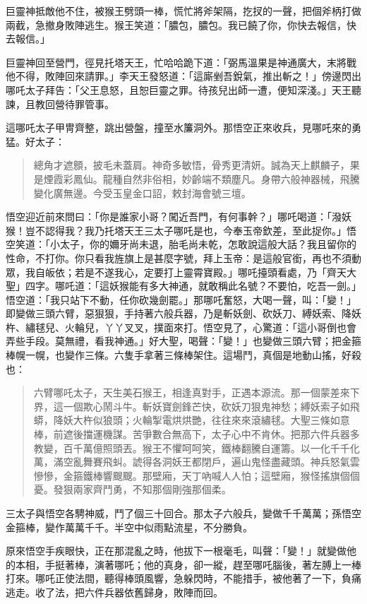 巨靈神抵敵他不住，被猴王劈頭一棒，慌忙將斧架隔，扢扠的一聲，把個斧柄打做兩截，急撤身敗陣逃生。猴王笑道：「膿包，膿包。我已饒了你，你快去報信，快去報信。」

巨靈神回至營門，徑見托塔天王，忙哈哈跪下道：「弼馬溫果是神通廣大，末將戰他不得，敗陣回來請罪。」李天王發怒道：「這廝剉吾銳氣，推出斬之！」傍邊閃出哪吒太子拜告：「父王息怒，且恕巨靈之罪。待孩兒出師一遭，便知深淺。」天王聽諫，且教回營待罪管事。

這哪吒太子甲冑齊整，跳出營盤，撞至水簾洞外。那悟空正來收兵，見哪吒來的勇猛。好太子：
\begin{quote}
總角才遮顖，披毛未蓋肩。神奇多敏悟，骨秀更清妍。誠為天上麒麟子，果是煙霞彩鳳仙。龍種自然非俗相，妙齡端不類塵凡。身帶六般神器械，飛騰變化廣無邊。今受玉皇金口詔，敕封海會號三壇。
\end{quote}

悟空迎近前來問曰：「你是誰家小哥？闖近吾門，有何事幹？」哪吒喝道：「潑妖猴！豈不認得我？我乃托塔天王三太子哪吒是也，今奉玉帝欽差，至此捉你。」悟空笑道：「小太子，你的嬭牙尚未退，胎毛尚未乾，怎敢說這般大話？我且留你的性命，不打你。你只看我旌旗上是甚麼字號，拜上玉帝：是這般官銜，再也不須動眾，我自皈依；若是不遂我心，定要打上靈霄寶殿。」哪吒擡頭看處，乃「齊天大聖」四字。哪吒道：「這妖猴能有多大神通，就敢稱此名號？不要怕，吃吾一劍。」悟空道：「我只站下不動，任你砍幾劍罷。」那哪吒奮怒，大喝一聲，叫：「變！」即變做三頭六臂，惡狠狠，手持著六般兵器，乃是斬妖劍、砍妖刀、縛妖索、降妖杵、繡毬兒、火輪兒，丫丫叉叉，撲面來打。悟空見了，心驚道：「這小哥倒也會弄些手段。莫無禮，看我神通。」好大聖，喝聲：「變！」也變做三頭六臂；把金箍棒幌一幌，也變作三條。六隻手拿著三條棒架住。這場鬥，真個是地動山搖，好殺也：
\begin{quote}
六臂哪吒太子，天生美石猴王，相逢真對手，正遇本源流。那一個蒙差來下界，這一個欺心鬧斗牛。斬妖寶劍鋒芒快，砍妖刀狠鬼神愁；縛妖索子如飛蟒，降妖大杵似狼頭；火輪掣電烘烘艷，往往來來滾繡毬。大聖三條如意棒，前遮後擋運機謀。苦爭數合無高下，太子心中不肯休。把那六件兵器多教變，百千萬億照頭丟。猴王不懼呵呵笑，鐵棒翻騰自運籌。以一化千千化萬，滿空亂舞賽飛虯。諕得各洞妖王都閉戶，遍山鬼怪盡藏頭。神兵怒氣雲慘慘，金箍鐵棒響颼颼。那壁廂，天丁吶喊人人怕；這壁廂，猴怪搖旗個個憂。發狠兩家齊鬥勇，不知那個剛強那個柔。
\end{quote}

三太子與悟空各騁神威，鬥了個三十回合。那太子六般兵，變做千千萬萬；孫悟空金箍棒，變作萬萬千千。半空中似雨點流星，不分勝負。

原來悟空手疾眼快，正在那混亂之時，他拔下一根毫毛，叫聲：「變！」就變做他的本相，手挺著棒，演著哪吒；他的真身，卻一縱，趕至哪吒腦後，著左膊上一棒打來。哪吒正使法間，聽得棒頭風響，急躲閃時，不能措手，被他著了一下，負痛逃走。收了法，把六件兵器依舊歸身，敗陣而回。


